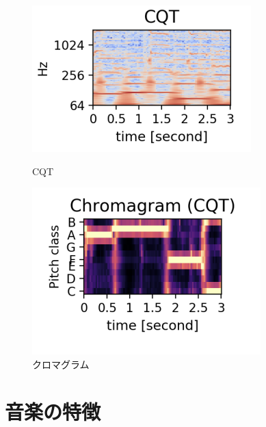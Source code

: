 \begin{figure}[b]
\centering
\begin{minipage}{0.48\columnwidth}
\centering
\includegraphics[width=\columnwidth]{figure/cqt.png}
\caption{CQT}
\label{fig:cqt}
\end{minipage}
\begin{minipage}{0.48\columnwidth}
\centering
\includegraphics[width=\columnwidth]{figure/choroma.png}
\caption{クロマグラム}
\label{fig:chroma}
\end{minipage}
\end{figure}
    
\clearpage



\section{音楽の特徴}

